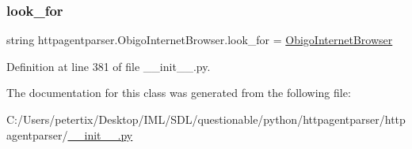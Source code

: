 \subsubsection{\texorpdfstring{look\+\_\+for}{look\_for}}
{\footnotesize\ttfamily string httpagentparser.\+Obigo\+Internet\+Browser.\+look\+\_\+for = \textquotesingle{}\hyperlink{classhttpagentparser_1_1_obigo_internet_browser}{Obigo\+Internet\+Browser}\textquotesingle{}\hspace{0.3cm}{\ttfamily [static]}}



Definition at line 381 of file \+\_\+\+\_\+init\+\_\+\+\_\+.\+py.



The documentation for this class was generated from the following file\+:\begin{DoxyCompactItemize}
\item 
C\+:/\+Users/petertix/\+Desktop/\+I\+M\+L/\+S\+D\+L/questionable/python/httpagentparser/httpagentparser/\hyperlink{____init_____8py}{\+\_\+\+\_\+init\+\_\+\+\_\+.\+py}\end{DoxyCompactItemize}
